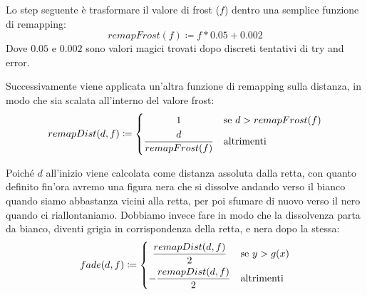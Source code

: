 \documentclass[main.tex]{subfiles}
\begin{document}
Lo step seguente è trasformare il valore di frost ($f$) dentro una semplice funzione di remapping:
\[remapFrost(f) \coloneqq f * 0.05 + 0.002\]
Dove $0.05$ e $0.002$ sono valori magici trovati dopo discreti tentativi di try and error.

Successivamente viene applicata un'altra funzione di remapping sulla distanza, in modo che sia scalata all'interno del valore frost:
\[remapDist(d, f) \coloneqq 
	\begin{dcases}
		\hfil 1 & \text{se } d > remapFrost(f)\\
		\frac{d}{remapFrost(f)} & \text{altrimenti}
	\end{dcases}
\]

Poiché $d$ all'inizio viene calcolata come distanza assoluta dalla retta, con quanto definito fin'ora avremo una figura nera che si dissolve andando verso il bianco quando siamo abbastanza vicini alla retta, per poi sfumare di nuovo verso il nero quando ci riallontaniamo. Dobbiamo invece fare in modo che la dissolvenza parta da bianco, diventi grigia in corrispondenza della retta, e nera dopo la stessa:
\[fade(d, f) \coloneqq 
	\begin{dcases}
		\hfil	 \frac{remapDist(d, f)}{2} & \text{se } y > g(x)\\
				-\frac{remapDist(d, f)}{2} & \text{altrimenti}
	\end{dcases}
\]
\newline
\end{document}
